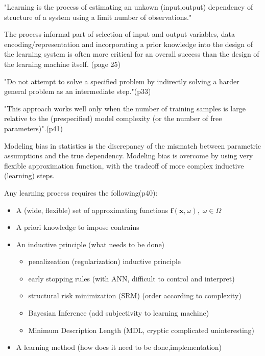 "Learning is the process of estimating an unkown (input,output) dependency of structure of a system using a limit number of observations."\cite{cherkassky1998learning}

The process informal part of selection of input and output variables, data encoding/representation and incorporating a prior knowledge into the design of the learning system is often more critical for an overall success than the design of the learning machine itself.\cite{cherkassky1998learning} (page 25)

"Do not attempt to solve a specified problem by indirectly solving a harder general problem as an intermediate step."\cite{cherkassky1998learning}(p33)

"This approach works well only when the number of training samples is large relative to the (prespecified) model complexity (or the number of free parameters)".\cite{cherkassky1998learning}(p41)

Modeling bias in statistics is the discrepancy of the mismatch between parametric assumptions and the true dependency.
Modeling bias is overcome by using very flexible approximation function, with the tradeoff of more complex inductive (learning) steps. 

Any learning process requires the following(p40): 
\begin{itemize}
	\item A (wide, flexible) set of approximating functions $\mathbf{f}(\mathbf{x},\omega),\; \omega \in \Omega$
	\item A priori knowledge to impose contrains
	\item An inductive principle (what needs to be done)
		\begin{itemize}
			\item penalizeation (regularization) inductive principle
			\item early stopping rules (with ANN, difficult to control and interpret)
			\item structural risk minimization (SRM) (order according to complexity)
			\item Bayesian Inference (add subjectivity to learning machine)
			\item Minimum Description Length (MDL, cryptic complicated uninteresting)
		\end{itemize}
	\item A learning method (how does it need to be done,implementation)
\end{itemize}

